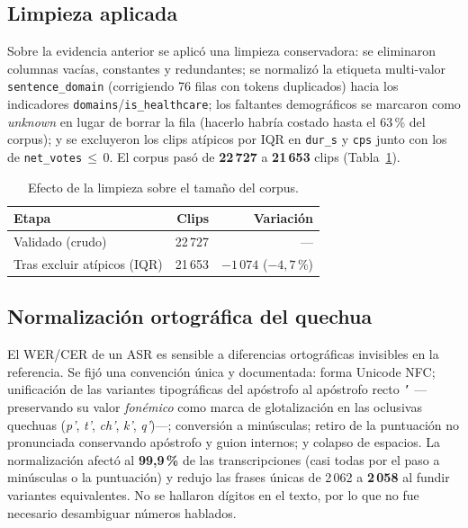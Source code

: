\subsection{Limpieza aplicada}
\label{sec:eda-limpieza}

Sobre la evidencia anterior se aplicó una limpieza conservadora: se eliminaron columnas
vacías, constantes y redundantes; se normalizó la etiqueta multi-valor
\texttt{sentence\_domain} (corrigiendo 76 filas con tokens duplicados) hacia los
indicadores \texttt{domains}/\texttt{is\_healthcare}; los faltantes demográficos se
marcaron como \emph{unknown} en lugar de borrar la fila (hacerlo habría costado hasta el
63\,\% del corpus); y se excluyeron los clips atípicos por IQR en \texttt{dur\_s} y
\texttt{cps} junto con los de \texttt{net\_votes}\,$\le$\,0. El corpus pasó de
\textbf{22\,727} a \textbf{21\,653} clips (Tabla~\ref{tab:limpieza}).

\begin{table}[H]
  \centering
  \small
  \caption{Efecto de la limpieza sobre el tamaño del corpus.}
  \label{tab:limpieza}
  \begin{tabular}{l r r}
    \toprule
    Etapa & Clips & Variación \\
    \midrule
    Validado (crudo)            & 22\,727 & --- \\
    Tras excluir atípicos (IQR) & 21\,653 & $-1\,074$ ($-4{,}7$\,\%) \\
    \bottomrule
  \end{tabular}
\end{table}

\subsection{Normalización ortográfica del quechua}
\label{sec:eda-normalizacion}

El WER/CER de un ASR es sensible a diferencias ortográficas invisibles en la referencia.
Se fijó una convención única y documentada: forma Unicode NFC; unificación de las
variantes tipográficas del apóstrofo al apóstrofo recto \texttt{'} —preservando su valor
\emph{fonémico} como marca de glotalización en las oclusivas quechuas (\emph{p'}, \emph{t'},
\emph{ch'}, \emph{k'}, \emph{q'})—; conversión a minúsculas; retiro de la puntuación no
pronunciada conservando apóstrofo y guion internos; y colapso de espacios. La
normalización afectó al \textbf{99,9\,\%} de las transcripciones (casi todas por el paso a
minúsculas o la puntuación) y redujo las frases únicas de 2\,062 a \textbf{2\,058} al
fundir variantes equivalentes. No se hallaron dígitos en el texto, por lo que no fue
necesario desambiguar números hablados.

